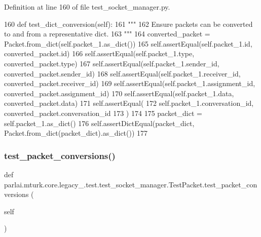 Definition at line 160 of file test\+\_\+socket\+\_\+manager.\+py.


\begin{DoxyCode}
160     \textcolor{keyword}{def }test\_dict\_conversion(self):
161         \textcolor{stringliteral}{"""}
162 \textcolor{stringliteral}{        Ensure packets can be converted to and from a representative dict.}
163 \textcolor{stringliteral}{        """}
164         converted\_packet = Packet.from\_dict(self.packet\_1.as\_dict())
165         self.assertEqual(self.packet\_1.id, converted\_packet.id)
166         self.assertEqual(self.packet\_1.type, converted\_packet.type)
167         self.assertEqual(self.packet\_1.sender\_id, converted\_packet.sender\_id)
168         self.assertEqual(self.packet\_1.receiver\_id, converted\_packet.receiver\_id)
169         self.assertEqual(self.packet\_1.assignment\_id, converted\_packet.assignment\_id)
170         self.assertEqual(self.packet\_1.data, converted\_packet.data)
171         self.assertEqual(
172             self.packet\_1.conversation\_id, converted\_packet.conversation\_id
173         )
174 
175         packet\_dict = self.packet\_1.as\_dict()
176         self.assertDictEqual(packet\_dict, Packet.from\_dict(packet\_dict).as\_dict())
177 
\end{DoxyCode}
\mbox{\label{classparlai_1_1mturk_1_1core_1_1legacy__2018_1_1test_1_1test__socket__manager_1_1TestPacket_a414a200c5af18b65d2947fdcc3dddb1d}} 
\subsubsection{\texorpdfstring{test\+\_\+packet\+\_\+conversions()}{test\_packet\_conversions()}}
{\footnotesize\ttfamily def parlai.\+mturk.\+core.\+legacy\+\_.\+test.\+test\+\_\+socket\+\_\+manager.\+Test\+Packet.\+test\+\_\+packet\+\_\+conversions (\begin{DoxyParamCaption}\item[{}]{self }\end{DoxyParamCaption})}

